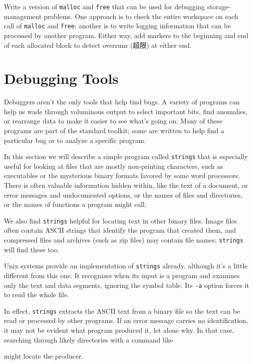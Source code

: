 \begin{exercise}
Write a version of \verb'malloc' and \verb'free' that can be used for
debugging storage-management problems. One approach is to check the entire
workspace on each call of \verb'malloc' and \verb'free'; another is to
write logging information that can be processed by another program. Either
way, add markers to the beginning and end of each allocated block to detect
overruns (超限) at either end.
\end{exercise}

\section{Debugging Tools}

Debuggers aren't the only tools that help tind bugs. A variety of programs
can help us wade through voluminous output to select important bits, find
anomalies, or rearrange data to make it easier to see what's going on. Many
of these programs are part of the standard toolkit; some are written to
help find a particular bug or to analyze a specific program.

In this section we will describe a simple program called \verb'strings'
that is especially useful for looking at files that are mostly non-printing
characters, such as executables or the mysterious binary formats favored by
some word processors. There is often valuable information hidden within,
like the text of a document, or error messages and undocumented options, or
the names of files and directories, or the names of functions a program
might call.

We also find \verb'strings' helpful for locating text in other binary
files.  Image files often contain ASCII strings that identify the program
that created them, and compressed files and archives (such as zip files)
may contain file names; \verb'strings' will find these too.

Unix systems provide an implementation of \verb'strings' already. although
it's a little different from this one. It recognizes when its input is a
program and examines only the text and data segments, ignoring the symbol
table. Its \verb'-a' option forces it to read the whole file.

In effect, \verb'strings' extracts the ASCII text from a binary file so the
text can be read or processed by other programs. If an error message
carries no identification, it may not be evident what program produced it,
let alone why. In that case, searching through likely directories with a
command like
\begin{wellcode}
\end{wellcode}
might locate the producer.

